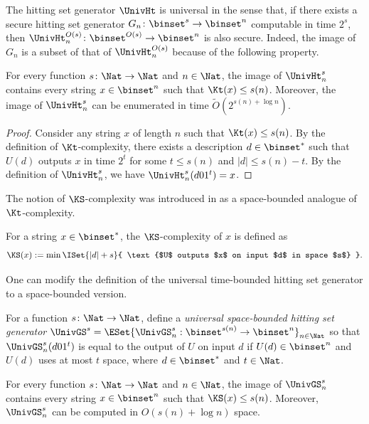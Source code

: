 \documentclass{toc}
\begin{document}
The hitting set generator $\UnivHt$ is universal in the sense that, if there exists a secure hitting set generator $G_n \colon \binset^{s} \to \binset^n$ computable in time $2^s$,
then
$\UnivHt^{O(s)}_n \colon \binset^{O(s)} \to \binset^n$ is also secure.
Indeed, the image of $G_n$ is a subset of that of $\UnivHt^{O(s)}_n$ because
of the following property.
\begin{proposition}
  \label{prop_UniversalHSGforTime}
  For every function $s \colon \Nat \to \Nat$ and $n \in \Nat$,
  the image of $\UnivHt^s_n$ contains every string $x \in \binset^n$ such that $\Kt(x) \le s(n)$.
  Moreover, the image of $\UnivHt^s_n$ can be enumerated in time $\widetilde O(2^{s(n) + \log n})$.
\end{proposition}
\begin{proof}
  Consider any string $x$ of length $n$ such that $\Kt(x) \le s(n)$.
  By the definition of $\Kt$-complexity,
  there exists a description $d \in \binset^*$ such that
  $U(d)$ outputs $x$ in time $2^t$ for some $t \le s(n)$ and $|d| \le s(n) - t$.
  By the definition of $\UnivHt^s_n$, we have
  $\UnivHt^s_n(d 0 1^t) = x$.
\end{proof}


The notion of $\KS$-complexity was introduced in \cite{AllenderBKMR06_siamcomp_journals}
as a space-bounded analogue of $\Kt$-complexity.
\begin{definition}
  For a string $x \in \binset^*$, the $\KS$-complexity of $x$ is defined as
  $$
    \KS(x) := \min \ISet { |d| + s } { \text{$U$ outputs $x$ on input $d$ in space $s$} }.
  $$
\end{definition}
One can modify the definition of the universal time-bounded hitting set generator
to a space-bounded version.
\begin{definition}
  For a function $s \colon \Nat \to \Nat$,
  define
  a \emph{universal space-bounded hitting set generator}
  $\UnivGS^s = \ESet{ \UnivGS^s_n : \binset^{s(n)} \to \binset^n }_{n \in \Nat}$
  so that
  $\UnivGS^s_n(d 0 1^t)$ is equal to
  the output of $U$ on input $d$ if
  $U(d) \in \binset^n$ and $U(d)$ uses at most $t$ space,
  where $d \in \binset^*$ and $t \in \Nat$.
\end{definition}
\begin{proposition}
  \label{prop_UniversalHSGforSpace}
  For every function $s \colon \Nat \to \Nat$ and $n \in \Nat$,
  the image of $\UnivGS^s_n$ contains every string $x \in \binset^n$ such that $\KS(x) \le s(n)$.
  Moreover, $\UnivGS^s_n$ can be computed in $O(s(n) + \log n)$ space.
\end{proposition}
\end{document}
